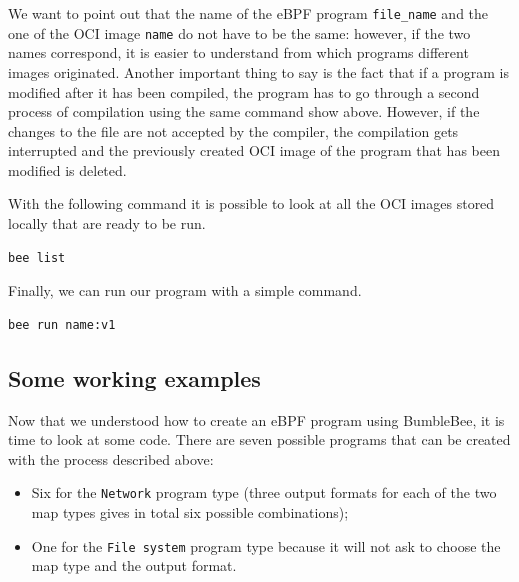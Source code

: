 We want to point out that the name of the eBPF program \colorbox{backcolour}{\lstinline[style=commandline, language=bash, breaklines=true]|file_name|} and the one of the OCI image \colorbox{backcolour}{\lstinline[style=commandline, language=bash, breaklines=true]|name|} do not have to be the same: however, if the two names correspond, it is easier to understand from which programs different images originated.
Another important thing to say is the fact that if a program is modified after it has been compiled, the program has to go through a second process of compilation using the same command show above.
However, if the changes to the file are not accepted by the compiler, the compilation gets interrupted and the previously created OCI image of the program that has been modified is deleted.

With the following command it is possible to look at all the OCI images stored locally that are ready to be run.

\begin{lstlisting}[style=commandline, language=bash, caption={\colorbox{backcolour}{\lstinline[style=commandline, language=bash]|bee|} list command.}]
	bee list
\end{lstlisting}

Finally, we can run our program with a simple command.

\begin{lstlisting}[style=commandline, language=bash, caption={\colorbox{backcolour}{\lstinline[style=commandline, language=bash]|bee|} run command.}]
	bee run name:v1
\end{lstlisting}

\subsection{Some working examples}

Now that we understood how to create an eBPF program using BumbleBee, it is time to look at some code.
There are seven possible programs that can be created with the process described above:

\begin{itemize}
	\item 
		Six for the \colorbox{backcolour}{\lstinline[style=commandline, language=bash, breaklines=true]|Network|} program type (three output formats for each of the two map types gives in total six possible combinations);
	\item 
		One for the \colorbox{backcolour}{\lstinline[style=commandline, language=bash, breaklines=true]|File system|} program type because it will not ask to choose the map type and the output format.
\end{itemize}

